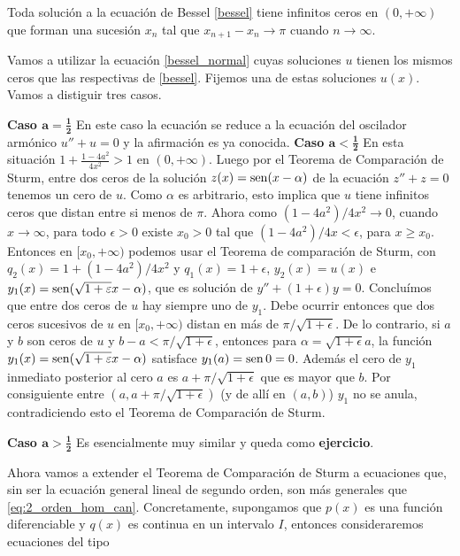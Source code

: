 \begin{corolario}  Toda solución a la ecuación de Bessel \eqref{bessel} tiene infinitos ceros en $(0,+\infty)$ que forman una sucesión $x_n$ tal que $x_{n+1}-x_n\to\pi$ cuando $n\to\infty$.
\end{corolario}
\begin{demo} Vamos a utilizar la ecuación \eqref{bessel_normal} cuyas soluciones $u$ tienen los mismos ceros que las respectivas de \eqref{bessel}. Fijemos una de estas soluciones $u(x)$. Vamos a distiguir tres casos.

\noindent\textbf{Caso $\boldsymbol{a=\frac12}$} En este caso la ecuación se reduce a la ecuación del oscilador armónico $u''+u=0$ y la afirmación es ya conocida.
\noindent\textbf{Caso $\boldsymbol{a<\frac12}$} En esta situación $1+\frac{1-4a^2}{4x^2}>1$ en $(0,+\infty)$.  Luego por el Teorema de Comparación de Sturm, entre dos ceros de la solución $z(x)=\operatorname{sen}(x-\alpha)$ de la ecuación $z''+z=0$ tenemos un cero de $u$. 
Como $\alpha$ es arbitrario, esto implica que $u$ tiene infinitos ceros que distan entre si menos de $\pi$. Ahora como $(1-4a^2)/4x^2\to 0$, 
cuando $x\to\infty$, para todo $\epsilon>0$ existe $x_0>0$ tal que   $(1-4a^2)/4x<\epsilon$, 
para $x\geq x_0$. Entonces en 
$[x_0,+\infty)$  podemos usar el Teorema de comparación de Sturm, con $q_2(x)=1+(1-4a^2)/4x^2$ y $q_1(x)=1+\epsilon$, $y_2(x)=u(x)$ e $y_1(x)=\operatorname{sen}(\sqrt{1+\varepsilon}x-\alpha)$, que es solución de $y''+(1+\epsilon)y=0$. Concluímos que entre dos ceros de $u$ hay siempre uno de $y_1$. Debe ocurrir entonces que  dos ceros sucesivos de $u$ en $[x_0,+\infty)$ distan en más de $\pi/\sqrt{1+\epsilon}$. De lo contrario, si $a$ y $b$ son ceros de $u$ y $b-a< \pi/\sqrt{1+\epsilon}$, 
entonces para $\alpha=\sqrt{1+\epsilon}a$,   la función $y_1(x)=\operatorname{sen}(\sqrt{1+\varepsilon}x-\alpha)$ satisface $y_1(a)=\operatorname{sen}0=0$. Además el cero de $y_1$ inmediato posterior al cero $a$ es  $a+\pi/\sqrt{1+\epsilon}$ que es mayor que $b$. Por consiguiente entre $(a,a+\pi/\sqrt{1+\epsilon})$ (y de allí en $(a,b)$) $y_1$ no se anula, contradiciendo esto el Teorema de Comparación de Sturm.

\noindent\textbf{Caso $\boldsymbol{a>\frac12}$} Es esencialmente muy similar y queda como \textbf{ejercicio}.
\end{demo}

Ahora vamos a extender el Teorema de Comparación de Sturm a ecuaciones que, sin ser la ecuación general lineal de segundo orden, son más generales que \eqref{eq:2_orden_hom_can}. Concretamente, supongamos que $p(x)$ es una función diferenciable y $q(x)$ es continua en un intervalo $I$, entonces consideraremos ecuaciones del tipo

